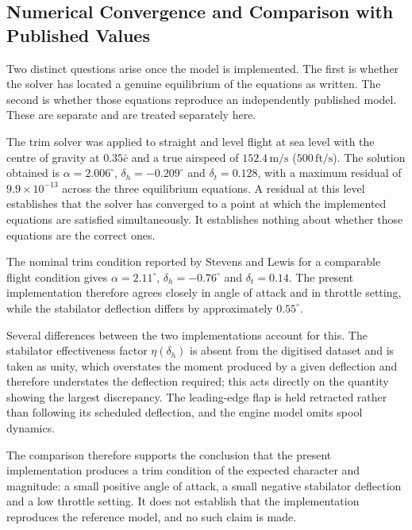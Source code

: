 \documentclass[
bindingoffset=5mm,  %
footnoteindent=3mm, %
hyphenation=true    %
]{src/wut-thesis}
\begin{document}
 
 \subsection{Numerical Convergence and Comparison with Published Values}
 \label{sec:verification}
 
 Two distinct questions arise once the model is implemented. The first is
 whether the solver has located a genuine equilibrium of the equations as
 written. The second is whether those equations reproduce an independently
 published model. These are separate and are treated separately here.
 
 The trim solver was applied to straight and level flight at sea level with the
 centre of gravity at $0.35\bar{c}$ and a true airspeed of $152.4\,\mathrm{m/s}$
 ($500\,\mathrm{ft/s}$). The solution obtained is $\alpha = 2.006^{\circ}$,
 $\delta_{h} = -0.209^{\circ}$ and $\delta_{t} = 0.128$, with a maximum residual
 of $9.9\times10^{-13}$ across the three equilibrium equations. A residual at
 this level establishes that the solver has converged to a point at which the
 implemented equations are satisfied simultaneously. It establishes nothing
 about whether those equations are the correct ones.
 
 The nominal trim condition reported by Stevens and Lewis \cite{stevenslewis}
 for a comparable flight condition gives $\alpha = 2.11^{\circ}$,
 $\delta_{h} = -0.76^{\circ}$ and $\delta_{t} = 0.14$. The present
 implementation therefore agrees closely in angle of attack and in throttle
 setting, while the stabilator deflection differs by approximately
 $0.55^{\circ}$.
 
 Several differences between the two implementations account for this. The
 stabilator effectiveness factor $\eta(\delta_{h})$ is absent from the
 digitised dataset and is taken as unity, which overstates the moment produced
 by a given deflection and therefore understates the deflection required; this
 acts directly on the quantity showing the largest discrepancy. The
 leading-edge flap is held retracted rather than following its scheduled
 deflection, and the engine model omits spool dynamics.
 
 The comparison therefore supports the conclusion that the present
 implementation produces a trim condition of the expected character and
 magnitude: a small positive angle of attack, a small negative stabilator
 deflection and a low throttle setting. It does not establish that the
 implementation reproduces the reference model, and no such claim is made.
 
\end{document}
